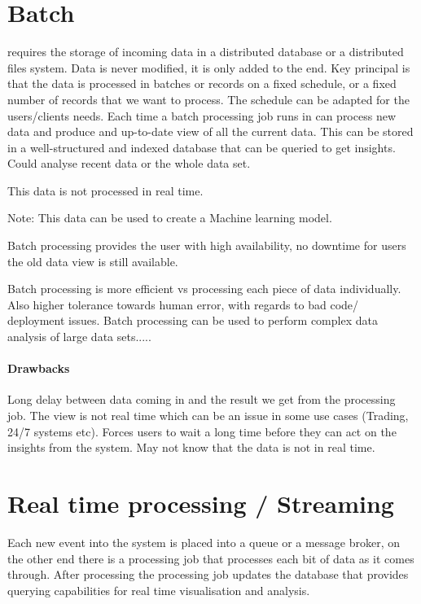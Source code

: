 \documentclass[a4paper, 11pt]{book}
\begin{document}
    \section{Batch}
    requires the storage of incoming data in a distributed database or a distributed files system.
    Data is never modified, it is only added to the end.
    Key principal is that the data is processed in batches or records on a fixed schedule, or a fixed number of records that we want to process.
    The schedule can be adapted for the users/clients needs.
    Each time a batch processing job runs in can process new data and produce and up-to-date view of all the current data.
    This can be stored in a well-structured and indexed database that can be queried to get insights.
    Could analyse recent data or the whole data set.

    This data is not processed in real time.

    Note: This data can be used to create a Machine learning model.

    Batch processing provides the user with high availability, no downtime for users the old data view is still available.

    Batch processing is more efficient vs processing each piece of data individually. Also higher tolerance towards human error, with regards to bad code/ deployment issues.
    Batch processing can be used to perform complex data analysis of large data sets.....

    \paragraph{Drawbacks}
    Long delay between data coming in and the result we get from the processing job.
    The view is not real time which can be an issue in some use cases (Trading, 24/7 systems etc).
    Forces users to wait a long time before they can act on the insights from the system.
    May not know that the data is not in real time.


    \section{Real time processing / Streaming}
    Each new event into the system is placed into a queue or a message broker, on the other end there is a processing job that processes each bit of data as it comes through.
    After processing the processing job updates the database that provides querying capabilities for real time visualisation and analysis.
\end{document}
